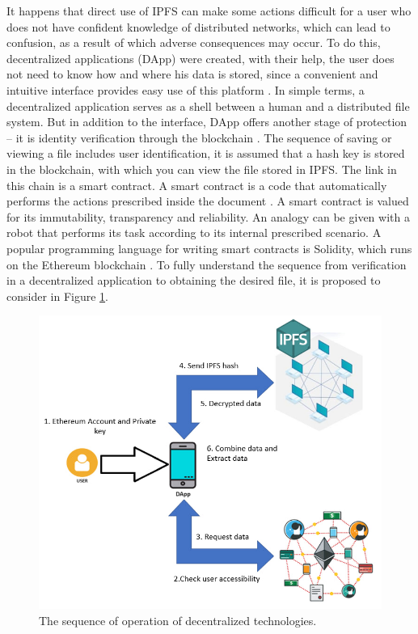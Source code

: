 \documentclass[10pt,conference,a4paper]{IEEEtran_EDM}
\begin{document}
It happens that direct use of IPFS can make some actions difficult for a user who does not have confident knowledge of distributed networks, which can lead to confusion, as a result of which adverse consequences may occur. To do this, decentralized applications (DApp) were created, with their help, the user does not need to know how and where his data is stored, since a convenient and intuitive interface provides easy use of this platform \cite{Infante}. In simple terms, a decentralized application serves as a shell between a human and a distributed file system. But in addition to the interface, DApp offers another stage of protection – it is identity verification through the blockchain \cite{Lin}. The sequence of saving or viewing a file includes user identification, it is assumed that a hash key is stored in the blockchain, with which you can view the file stored in IPFS. The link in this chain is a smart contract. A smart contract is a code that automatically performs the actions prescribed inside the document \cite{Frolov}. A smart contract is valued for its immutability, transparency and reliability. An analogy can be given with a robot that performs its task according to its internal prescribed scenario. A popular programming language for writing smart contracts is Solidity, which runs on the Ethereum blockchain \cite{Khan Nabeel}. To fully understand the sequence from verification in a decentralized application to obtaining the desired file, it is proposed to consider in Figure \ref{Sequence}.

\begin{figure}
\centerline{\includegraphics[scale=0.67]{fig2.png}}
\caption{The sequence of operation of decentralized technologies.}
\label{Sequence}
\end{figure}
\end{document}
